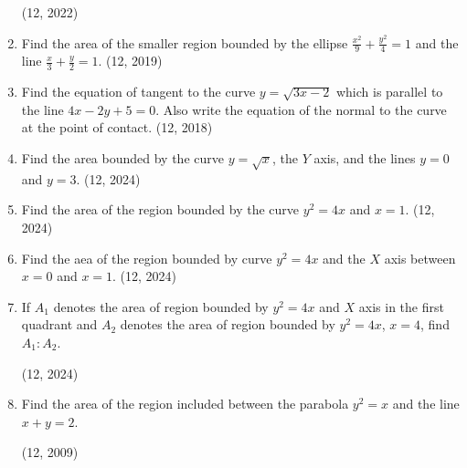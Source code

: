 \begin{enumerate}[label=\thesubsection.\arabic*,ref=\thesubsection.\theenumi]
\hfill (12, 2022)

\item Find the area of the smaller region bounded by the ellipse $\frac{x^{2}}{9}+\frac{y^{2}}{4}=1$ and the line $\frac{x}{3}+\frac{y}{2}=1$.
\hfill (12, 2019)
\item Find the equation of tangent to the curve $y=\sqrt{3x-2}$ which is parallel to the line $4x-2y+5=0$. Also write the equation of the normal to the curve at the point of contact.
\hfill (12, 2018)
     \item Find the area bounded by the curve $y = \sqrt{x}$, the $Y$ axis, and the lines $y = 0$ and $y = 3$.
		\hfill (12, 2024)
\item Find the area of the region bounded by the curve $y^2=4x$ and $x=1$. 
		\hfill (12, 2024)
\item Find the aea of the region bounded by curve $y^2 = 4x$ and the $X$ axis between $x = 0$ and $x = 1$. 
		\hfill (12, 2024)
	\item If $A_{1}$ denotes the area of region bounded by $y^{2} = 4x$ and $X$ axis in the first quadrant and $A_{2}$ denotes the area of region bounded by $y^{2} = 4x$, $x=4$, find $A_{1} : A_{2}$.

		\hfill (12, 2024)
\item 
Find the area of the region included between the parabola ${y}^ {2} = x$ and the line $x + y = 2$.

\hfill	(12, 2009)
%
\end{enumerate}
